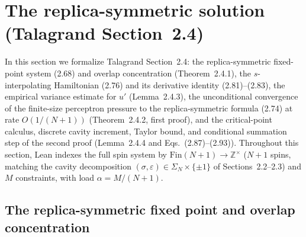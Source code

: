 \section{The replica-symmetric solution (Talagrand Section~2.4)}\label{sec:sg-tal:perceptron-replica-symmetric}

In this section we formalize Talagrand Section~2.4: the replica-symmetric fixed-point system
(2.68) and overlap concentration (Theorem~2.4.1), the $s$-interpolating Hamiltonian (2.76) and its
derivative identity (2.81)--(2.83), the empirical variance estimate for $u'$ (Lemma~2.4.3), the
unconditional convergence of the finite-size perceptron pressure to the replica-symmetric formula
(2.74) at rate $O(1/(N+1))$ (Theorem~2.4.2, first proof), and the critical-point calculus,
discrete cavity increment, Taylor bound, and conditional summation step of the second proof
(Lemma~2.4.4 and Eqs.~(2.87)--(2.93)). Throughout
this section, Lean indexes the full spin system by $\mathrm{Fin}(N+1)\to\mathbb Z^\times$ ($N+1$
spins, matching the cavity decomposition $(\sigma,\varepsilon)\in\Sigma_N\times\{\pm 1\}$ of
Sections~2.2--2.3) and $M$ constraints, with load $\alpha=M/(N+1)$.

\subsection{The replica-symmetric fixed point and overlap concentration}
\label{sub:sg-tal:perceptron-rs-fixed-point}

